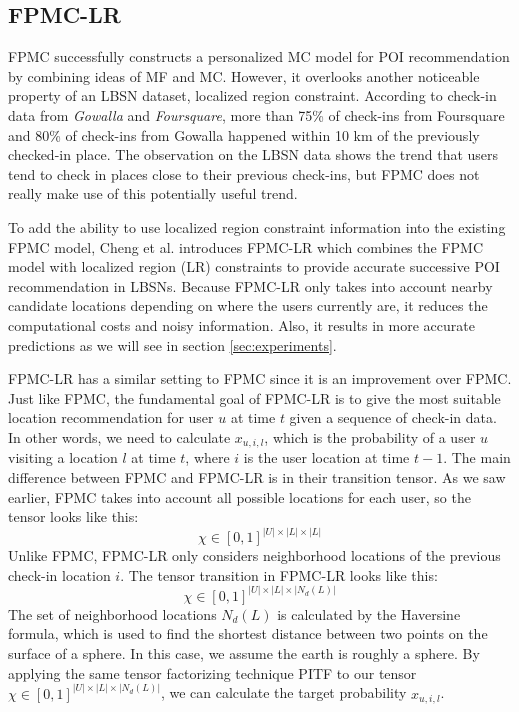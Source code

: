 \documentclass{sig-alternate}
\begin{document}
\subsection{FPMC-LR}
\label{sec:typeChangesSpecialChars}

FPMC successfully constructs a personalized MC model for POI recommendation
by combining ideas of MF and MC. However, it overlooks another noticeable property 
of an LBSN dataset, localized region constraint. According to check-in data from 
\emph{Gowalla} and \emph{Foursquare}, more than 75\% of check-ins from Foursquare and 80\% of check-ins 
from Gowalla happened within 10 km of the previously checked-in place. \cite{Cheng:2013} The observation on the LBSN data
shows the trend that users tend to check in places close to their previous check-ins, 
but FPMC does not really make use of this potentially useful trend.

To add the ability to use localized region constraint 
information into the existing FPMC model, Cheng et al. \cite{Cheng:2013}
introduces FPMC-LR which combines the FPMC model with localized 
region (LR) constraints to provide accurate successive POI recommendation in LBSNs. 
Because FPMC-LR only takes into account nearby candidate locations depending 
on where the users currently are, it reduces the computational costs and noisy information. 
Also, it results in more accurate predictions as we will see in section \ref{sec:experiments}.

FPMC-LR has a similar setting to FPMC since it is an improvement 
over FPMC. Just like FPMC, the fundamental goal of FPMC-LR is to give the most suitable 
location recommendation for user $u$ at time $t$ given a sequence of check-in data. 
In other words, we need to calculate $x_{u,i,l}$, which is the probability of a user $u$ visiting a location $l$ at time $t$,
where $i$ is the user location at time $t-1$.
The main difference between FPMC and FPMC-LR is in their transition tensor. As we saw earlier, FPMC takes into account 
all possible locations for each user, so the tensor looks like this: 
\begin{equation}
	\chi \in [0, 1]^{|U| \times |L| \times |L|}
\label{eq:summation}
\end{equation}
Unlike FPMC, FPMC-LR only considers neighborhood locations of the previous check-in location $i$. 
The tensor transition in FPMC-LR looks like this:
\begin{equation}
	\chi \in [0, 1]^{|U| \times |L| \times |N_d(L)|}
\label{eq:summation}
\end{equation}
The set of neighborhood locations \begin{math}N_d(L)\end{math} is calculated by the Haversine formula, 
which is used to find the shortest distance between two points on the surface of a sphere. 
In this case, we assume the earth is roughly a sphere. By applying the same tensor factorizing technique PITF to 
our tensor $\chi \in [0, 1]^{|U| \times |L| \times |N_d(L)|}$, we can calculate the target probability $x_{u,i,l}$.
\end{document}
